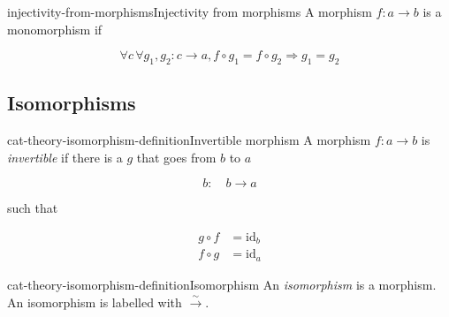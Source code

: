 \documentclass[preview]{standalone}
\begin{document}
\begin{snippetdefinition}{injectivity-from-morphisms}{Injectivity from morphisms}
    A morphism \(f\colon a \rightarrow b\) is a monomorphism if
    
    \[
        \forall c\, \forall g_1, g_2: c \rightarrow a, 
        f \circ g_1 = f \circ g_2 \Rightarrow g_1 = g_2
    \]

    \begin{center}
    \end{center}
\end{snippetdefinition}

\subsection{Isomorphisms}

\begin{snippetdefinition}{cat-theory-isomorphism-definition}{Invertible morphism}
    A morphism \(f\colon a \rightarrow b\) is \textit{invertible} if there
    is a \function \(g\) that goes from \(b\) to \(a\)
    
    \[
        b:\quad b \rightarrow a
    \]
    
    such that
    
    \begin{align*}
        g \circ f &= \text{id}_b
        \\
        f \circ g &= \text{id}_a
    \end{align*}
    
    \begin{center}
    \end{center}
\end{snippetdefinition}

\begin{snippetdefinition}{cat-theory-isomorphism-definition}{Isomorphism}
    An \textit{isomorphism} is a \bijective morphism.
    An isomorphism is labelled with \(\xrightarrow{\sim}\).
\end{snippetdefinition}

\end{document}
